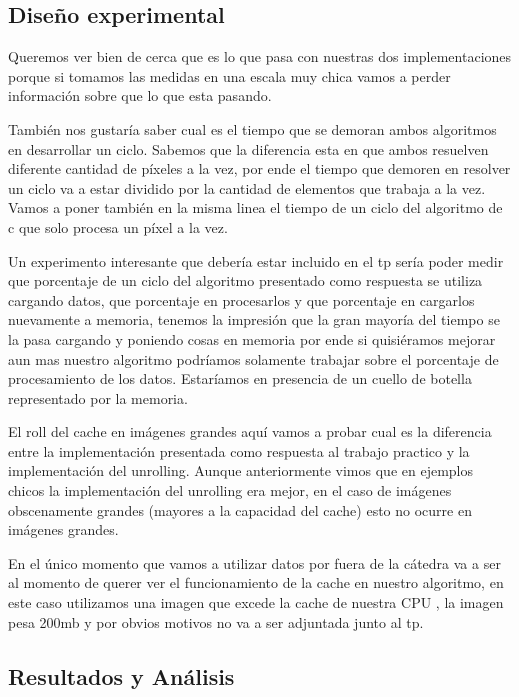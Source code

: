 \subsection{Diseño experimental}

Queremos ver bien de cerca que es lo que pasa con nuestras dos implementaciones porque si tomamos las medidas en una escala muy chica vamos a perder información sobre que lo que esta pasando. 

También nos gustaría saber cual es el tiempo que se demoran ambos algoritmos en desarrollar un ciclo. Sabemos que la diferencia esta en que ambos resuelven diferente cantidad de  píxeles a la vez, por ende el tiempo que demoren en resolver un ciclo va a estar dividido por la cantidad de elementos que trabaja a la vez. Vamos a poner también en la misma linea el tiempo de un ciclo del algoritmo de c que solo procesa un píxel a la vez.

Un experimento interesante que debería estar incluido en el tp sería poder medir que porcentaje de un ciclo del algoritmo presentado como respuesta se utiliza cargando datos, que porcentaje en procesarlos y que porcentaje en cargarlos nuevamente a memoria, tenemos la impresión que la gran mayoría del tiempo se la pasa cargando y poniendo cosas en memoria por ende si quisiéramos mejorar aun mas nuestro algoritmo podríamos solamente trabajar sobre el porcentaje de procesamiento de los datos. Estaríamos en presencia de un cuello de botella representado por la memoria.

El roll del cache en imágenes grandes aquí vamos a probar cual es la diferencia entre la implementación presentada como respuesta al trabajo practico y la implementación del unrolling. Aunque anteriormente vimos que en ejemplos chicos la implementación del unrolling era mejor, en el caso de imágenes obscenamente grandes (mayores a la capacidad del cache) esto no ocurre en imágenes grandes.

En el único momento que vamos a utilizar datos por fuera de la cátedra va a ser al momento de querer ver el funcionamiento de la cache en nuestro algoritmo, en este caso utilizamos una imagen que excede la cache de nuestra CPU , la imagen pesa 200mb y por obvios motivos no va a ser adjuntada junto al tp.

\subsection{Resultados y Análisis}

